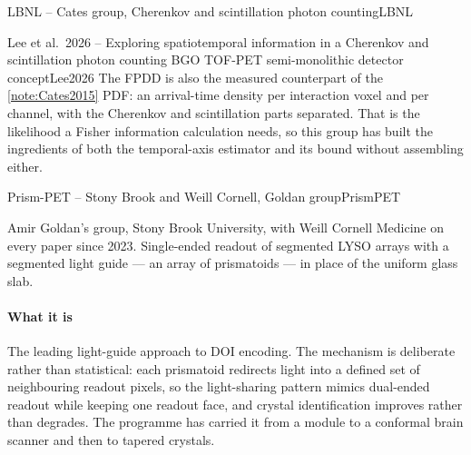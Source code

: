 \begin{programnote}{LBNL -- Cates group, Cherenkov and scintillation photon counting}{LBNL}
\begin{papernote}{Lee et al.\ 2026 -- Exploring spatiotemporal information in a Cherenkov and scintillation photon counting BGO TOF-PET semi-monolithic detector concept}{Lee2026}
The FPDD is also the measured counterpart of the \ref{note:Cates2015} PDF: an
arrival-time density per interaction voxel and per channel, with the
Cherenkov and scintillation parts separated. That is the likelihood a Fisher
information calculation needs, so this group has built the ingredients of
both the temporal-axis estimator and its bound without assembling either.

\end{papernote}

\end{programnote}

\begin{programnote}{Prism-PET -- Stony Brook and Weill Cornell, Goldan group}{PrismPET}

Amir Goldan's group, Stony Brook University, with Weill Cornell Medicine on
every paper since 2023. Single-ended readout of segmented LYSO arrays with a
segmented light guide --- an array of prismatoids --- in place of the uniform
glass slab.

\paragraph{What it is}
The leading light-guide approach to DOI encoding. The mechanism is deliberate
rather than statistical: each prismatoid redirects light into a defined set of
neighbouring readout pixels, so the light-sharing pattern mimics dual-ended
readout while keeping one readout face, and crystal identification improves
rather than degrades. The programme has carried it from a module to a conformal
brain scanner and then to tapered crystals.


\end{programnote}
